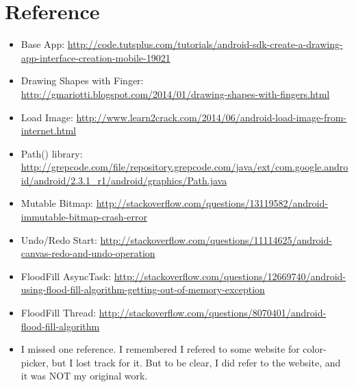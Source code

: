 \documentclass[9pt,b5paper]{article}
\begin{document}
\section{Reference}
\label{sec-5}
\begin{itemize}
\item Base App: \url{http://code.tutsplus.com/tutorials/android-sdk-create-a-drawing-app-interface-creation-mobile-19021}
\item Drawing Shapes with Finger: \url{http://gmariotti.blogspot.com/2014/01/drawing-shapes-with-fingers.html}
\item Load Image: \url{http://www.learn2crack.com/2014/06/android-load-image-from-internet.html}
\item Path() library: \url{http://grepcode.com/file/repository.grepcode.com/java/ext/com.google.android/android/2.3.1_r1/android/graphics/Path.java}
\item Mutable Bitmap: \url{http://stackoverflow.com/questions/13119582/android-immutable-bitmap-crash-error}
\item Undo/Redo Start: \url{http://stackoverflow.com/questions/11114625/android-canvas-redo-and-undo-operation}
\item FloodFill AsyncTask: \url{http://stackoverflow.com/questions/12669740/android-using-flood-fill-algorithm-getting-out-of-memory-exception}
\item FloodFill Thread: \url{http://stackoverflow.com/questions/8070401/android-flood-fill-algorithm}
\item I missed one reference. I remembered I refered to some website for color-picker, but I lost track for it. But to be clear, I did refer to the website, and it was NOT my original work.
\end{itemize}
\end{document}
